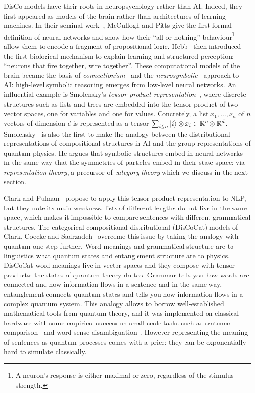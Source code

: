 DisCo models have their roots in neuropsychology rather than AI.
Indeed, they first appeared as models of the brain rather than architectures of learning machines.
In their seminal work~\cite{McCullochPitts43}, McCullogh and Pitts give the first formal definition of neural networks and show how their ``all-or-nothing'' behaviour\footnote
{A neuron's response is either maximal or zero, regardless of the stimulus strength.}
allow them to encode a fragment of propositional logic.
Hebb~\cite{Hebb49} then introduced the first biological mechanism to explain learning and structured perception: ``neurons that fire together, wire together''.
These computational models of the brain became the basis of \emph{connectionism}~\cite{Smolensky87,Smolensky88} and the \emph{neurosymbolic}~\cite{Hilario97} approach to AI: high-level symbolic reasoning emerges from low-level neural networks.
An influential example is Smolensky's \emph{tensor product representation}~\cite{Smolensky90}, where discrete structures such as lists and trees are embedded into the tensor product of two vector spaces, one for variables and one for values.
Concretely, a list $x_1, \dots, x_n$ of $n$ vectors of dimension $d$ is represented as a tensor $\sum_{i \leq n} |i\rangle \otimes x_i \in \mathbb{R}^n \otimes \mathbb{R}^d$.
Smolensky~\cite{Smolensky90} is also the first to make the analogy between the distributional representations of compositional structures in AI and the group representations of quantum physics.
He argues that symbolic structures embed in neural networks in the same way that the symmetries of particles embed in their state space: via \emph{representation theory}, a precursor of \emph{category theory} which we discuss in the next section.

Clark and Pulman~\cite{ClarkPulman07} propose to apply this tensor product representation to NLP, but they note its main weakness: lists of different lengths do not live in the same space, which makes it impossible to compare sentences with different grammatical structures.
The categorical compositional distributional (DisCoCat) models of Clark, Coecke and Sadrzadeh~\cite{ClarkEtAl08,ClarkEtAl10} overcome this issue by taking the analogy with quantum one step further.
Word meanings and grammatical structure are to linguistics what quantum states and entanglement structure are to physics.
DisCoCat word meanings live in vector spaces and they compose with tensor products: the states of quantum theory do too.
Grammar tells you how words are connected and how information flows in a sentence and in the same way, entanglement connects quantum states and tells you how information flows in a complex quantum system.
This analogy allows to borrow well-established mathematical tools from quantum theory, and it was implemented on classical hardware with some empirical success on small-scale tasks such as sentence comparison~\cite{GrefenstetteEtAl11} and word sense disambiguation~\cite{GrefenstetteSadrzadeh11,KartsaklisEtAl13}.
However representing the meaning of sentences as quantum processes comes with a price: they can be exponentially hard to simulate classically.

